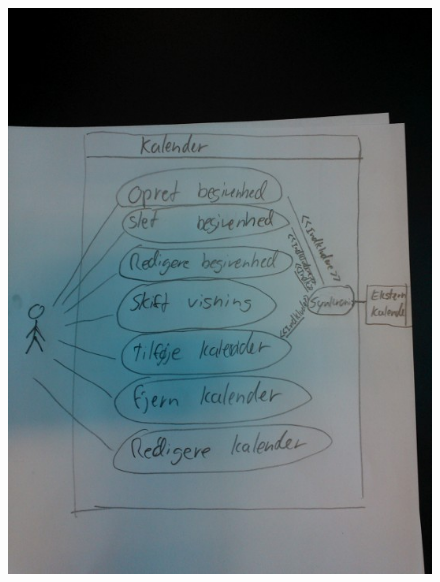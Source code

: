    
   \begin{figure}[h]
\caption{}   
   \centering
   \includegraphics[scale=1.75]{LatexFiles/Analyze/UseCase/WP_000143.jpg}
   \end{figure}